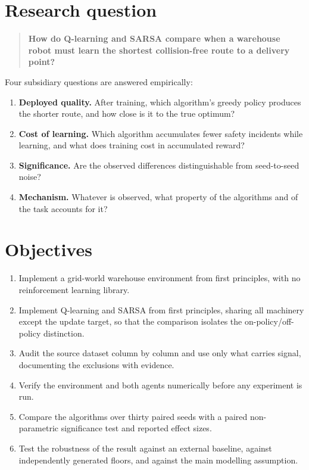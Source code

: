 \section{Research question}

\begin{quote}
\textbf{How do Q-learning and SARSA compare when a warehouse robot must learn the shortest
collision-free route to a delivery point?}
\end{quote}

Four subsidiary questions are answered empirically:

\begin{enumerate}
\item \textbf{Deployed quality.} After training, which algorithm's greedy policy produces the
      shorter route, and how close is it to the true optimum?
\item \textbf{Cost of learning.} Which algorithm accumulates fewer safety incidents while learning,
      and what does training cost in accumulated reward?
\item \textbf{Significance.} Are the observed differences distinguishable from seed-to-seed noise?
\item \textbf{Mechanism.} Whatever is observed, what property of the algorithms and of the task
      accounts for it?
\end{enumerate}

\section{Objectives}

\begin{enumerate}
\item Implement a grid-world warehouse environment from first principles, with no reinforcement
      learning library.
\item Implement Q-learning and SARSA from first principles, sharing all machinery except the
      update target, so that the comparison isolates the on-policy/off-policy distinction.
\item Audit the source dataset column by column and use only what carries signal, documenting the
      exclusions with evidence.
\item Verify the environment and both agents numerically before any experiment is run.
\item Compare the algorithms over thirty paired seeds with a paired non-parametric significance
      test and reported effect sizes.
\item Test the robustness of the result against an external baseline, against independently
      generated floors, and against the main modelling assumption.
\end{enumerate}

